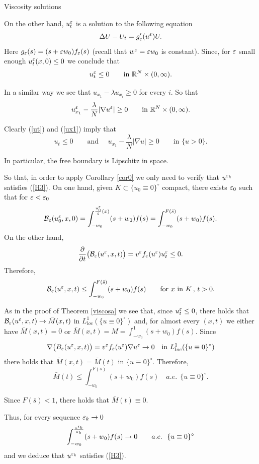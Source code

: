 \begin{section}{Viscosity solutions}
\begin{pf}
On the other hand,
 $u^\varepsilon_t$ is a solution to the following equation
$$
\Delta U-U_t=g_\varepsilon'(u^\varepsilon)U.
$$
Here $g_\varepsilon(s)=(s+\varepsilon w_0)f_\varepsilon(s)$ (recall that $w^\varepsilon=\varepsilon w_0$ is constant). Since, for $\varepsilon$ small enough $u^\varepsilon_t(x,0)\le0$
we conclude that
\begin{equation}
\label{ut}
u^\varepsilon_t\le0\qquad\mbox{in }{\Bbb R}^N\times(0,\infty).
\end{equation}

In a similar way we see that $u_{x_1}-\lambda u_{x_i}\ge0$ for every $i$. So
that
\begin{equation}
\label{ux1}
u^\varepsilon_{x_1}-\frac\lambda N|\nabla u^\varepsilon|\ge0\qquad\mbox{in }{\Bbb R}^N\times(0,\infty).
\end{equation}

Clearly (\ref{ut}) and (\ref{ux1}) imply that
$$
u_t\le0\qquad\mbox{and }\quad u_{x_1}-\frac\lambda N|\nabla u|\ge0\qquad
\mbox{in }\{u>0\}.
$$

In particular, the free boundary is Lipschitz in space.

So that, in order to apply Corollary \ref{cor0} we only need to verify that
$u^{\varepsilon_k}$ satisfies (\ref{H3}).
On one hand, given $K\subset\{u_0\equiv0\}^\circ$ compact, there exists
$\varepsilon_0$ such that for $\varepsilon<\varepsilon_0$
$$
{\cal B}_\varepsilon(u^\varepsilon_0,x,0)=\int_{-w_0}^{\frac{u_0^\varepsilon}{\varepsilon}(x)}(s+w_0)
f(s)=\int_{-w_0}^{F(\bar s)}(s+w_0)f(s).
$$
On the other hand,
$$
\frac\partial{\partial t}\big({\cal B}_\varepsilon(u^\varepsilon,x,t)\big)=
v^\varepsilon f_\varepsilon(u^\varepsilon)u^\varepsilon_t\le0.
$$
Therefore,
$$
{\cal B}_\varepsilon(u^\varepsilon,x,t)\le \int_{-w_0}^{F(\bar s)}(s+w_0)f(s)\qquad\mbox{for }
x \mbox{ in }K\,,\, t>0.
$$

As in the proof of Theorem \ref{viscosa} we see that, since $u^\varepsilon_t\le0$,
there holds that ${\cal B}_\varepsilon(u^\varepsilon,x,t)\to \bar M(x,t)$ in $L^1_{loc}(\{u\equiv
0\}^\circ)$ and, for almost every $(x,t)$ we either have $\bar M(x,t)=0$ or $\bar M(x,t)=M
=\int_{-w_0}^1(s+w_0)f(s)$.
Since
$$
\nabla \big(B_\varepsilon(u^\varepsilon,x,t)\big)=v^\varepsilon f_\varepsilon(u^\varepsilon)\nabla u^\varepsilon\to 0\quad\mbox
{in }L^1_{loc}(\{u\equiv0\}^\circ)
$$
there holds that $\bar M(x,t)=\bar M(t)$ in $\{u\equiv0\}^\circ$. Therefore,
$$
\bar M(t)\le \int_{-w_0}^{F(\bar s)}(s+w_0)f(s)\quad a.e.\ \ \{u\equiv0\}^\circ.
$$

Since $F(\bar s)<1$, there holds that $\bar M(t)\equiv0$. 

Thus, for every sequence ${\varepsilon_k}\to 0$
$$
\int_{-w_0}^{\frac{u^{\varepsilon_k}}{{\varepsilon_k}}}(s+w_0)f(s)\to 0\qquad a.e.\ \  \{u\equiv0\}^\circ
$$
and we deduce that $u^{\varepsilon_k}$ satisfies (\ref{H3}).
\end{pf}







\end{section}
